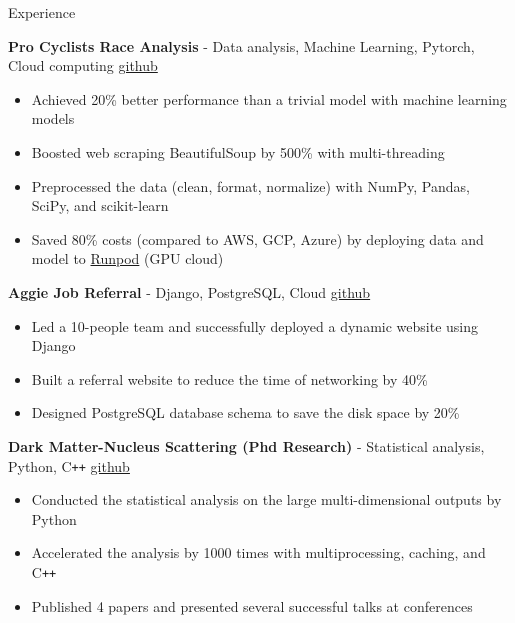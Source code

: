 \documentclass{resume}
\begin{document}
\begin{rSection}{Experience}
    \vspace{-1.25em}
    \item \textbf{Pro Cyclists Race Analysis} - {Data analysis, Machine Learning, Pytorch, Cloud computing} \hfill {\href{https://github.com/noctildon/pro_cyclists}{github}}
        \begin{itemize}
        \itemsep -3pt {}
        \item Achieved 20\% better performance than a trivial model with machine learning models
        \item Boosted web scraping BeautifulSoup by 500\% with multi-threading
        \item Preprocessed the data (clean, format, normalize) with NumPy, Pandas, SciPy, and scikit-learn
        \item Saved 80\% costs (compared to AWS, GCP, Azure) by deploying data and model to \href{https://www.runpod.io/}{Runpod} (GPU cloud)
        \end{itemize}
    \item \textbf{Aggie Job Referral} - {Django, PostgreSQL, Cloud} \hfill {\href{https://github.com/noctildon/aggie-job-referral}{github}}
        \begin{itemize}
        \itemsep -3pt {}
        \item Led a 10-people team and successfully deployed a dynamic website using Django
        \item Built a referral website to reduce the time of networking by 40\%
        \item Designed PostgreSQL database schema to save the disk space by 20\%
        \end{itemize}
    \item \textbf{Dark Matter-Nucleus Scattering (Phd Research)} - {Statistical analysis, Python, C\texttt{++}} \hfill {\href{https://github.com/noctildon/Inelastic}{github}}
        \begin{itemize}
        \itemsep -3pt {}
        \item Conducted the statistical analysis on the large multi-dimensional outputs by Python
        \item Accelerated the analysis by 1000 times with multiprocessing, caching, and C\texttt{++}
        \item Published 4 papers and presented several successful talks at conferences
        \end{itemize}
\end{rSection}
\end{document}
